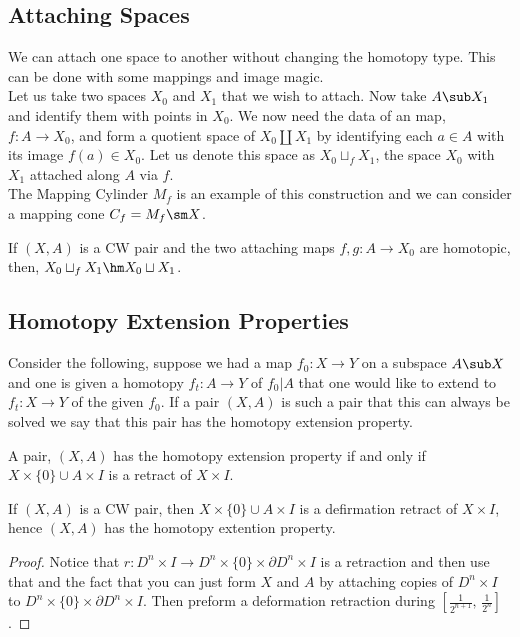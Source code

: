 \subsection{Attaching Spaces}
We can attach one space to another without changing the homotopy type. This can be done with some mappings and image magic.\\

\noindent
Let us take two spaces $X_0$ and $X_1$ that we wish to attach. Now take $A \sub X_1$ and identify them with points in $X_0$. We now need the data of an map, $f : A \to X_0$, and form a quotient space of $X_0 \coprod X_1$ by identifying each $a \in A$ with its image $f(a) \in X_0$. Let us denote this space as $X_0 \sqcup_f X_1$, the space $X_0$ with $X_1$ attached along $A$ via $f$.\\

\noindent
The Mapping Cylinder $M_f$ is an example of this construction and we can consider a mapping cone $C_f = M_f \sm X$.

\begin{claim}
  If $(X, A)$ is a CW pair and the two attaching maps $f, g : A \to X_0$ are homotopic, then, $X_0 \sqcup_f X_1 \hm X_0 \sqcup X_1$.
\end{claim}

\subsection{Homotopy Extension Properties}
Consider the following, suppose we had a map $f_0 : X \to Y$ on a subspace $A \sub X$ and one is given a homotopy $f_t : A \to Y$ of $f_0 | A$ that one would like to extend to $f_t : X \to Y$ of the given $f_0$. If a pair $(X, A)$ is such a pair that this can always be solved we say that this pair has the homotopy extension property.

\begin{claim}
  A pair, $(X, A)$ has the homotopy extension property if and only if $X \times \{0\} \cup A \times I$ is a retract of $X \times I$.
\end{claim}

\begin{nprop}
  If $(X, A)$ is a CW pair, then $X \times \{0\} \cup A \times I$ is a defirmation retract of $X \times I$, hence $(X, A)$ has the homotopy extention property.
\end{nprop}
\begin{proof}
  Notice that $r : D^n \times I \to D^n \times \{0\} \times \partial D^n \times I$ is a retraction and then use that and the fact that you can just form $X$ and $A$ by attaching copies of $D^n \times I$ to $D^n \times \{0\} \times \partial D^n \times I$. Then preform a deformation retraction during $[\frac{1}{2^{n+1}},\, \frac{1}{2^n}]$.
\end{proof}

